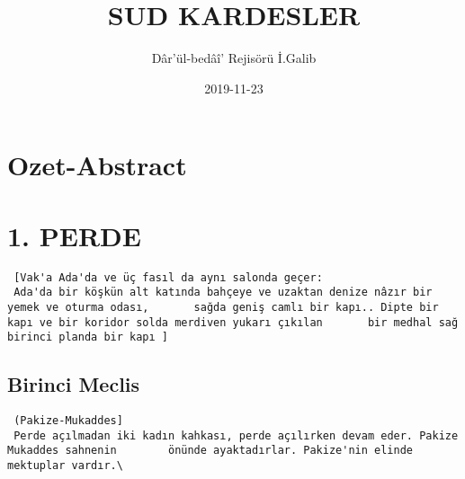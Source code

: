 \documentclass[]{book}
\title{SUD KARDESLER}
\author{Dâr'ül-bedâî' Rejisörü İ.Galib}
\date{2019-11-23}
\begin{document}
\maketitle

{
\setcounter{tocdepth}{1}
\tableofcontents
}
\hypertarget{ozet-abstract}{%
\chapter{Ozet-Abstract}\label{ozet-abstract}}

\hypertarget{perde}{%
\chapter{1. PERDE}\label{perde}}

\begin{verbatim}
 [Vak'a Ada'da ve üç fasıl da aynı salonda geçer:
 Ada'da bir köşkün alt katında bahçeye ve uzaktan denize nâzır bir yemek ve oturma odası,       sağda geniş camlı bir kapı.. Dipte bir kapı ve bir koridor solda merdiven yukarı çıkılan       bir medhal sağ birinci planda bir kapı ]
\end{verbatim}

\hypertarget{birinci-meclis}{%
\section{Birinci Meclis}\label{birinci-meclis}}

\begin{verbatim}
 (Pakize-Mukaddes]
 Perde açılmadan iki kadın kahkası, perde açılırken devam eder. Pakize Mukaddes sahnenin        önünde ayaktadırlar. Pakize'nin elinde mektuplar vardır.\
\end{verbatim}
\end{document}
